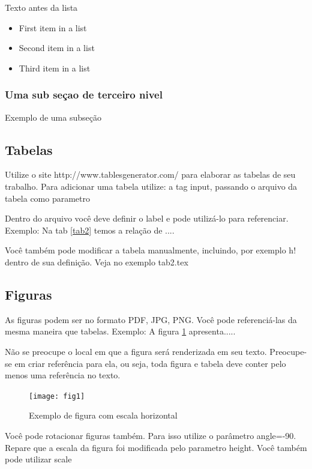 \documentclass[	DIV=calc,%
							paper=a4,%
							fontsize=12pt,%
							onecolumn]{scrartcl}	 					%
\begin{document}
Texto antes da lista

\begin{itemize}
	\item First item in a list 
	\item Second item in a list 
	\item Third item in a list
\end{itemize}

\subsubsection{Uma sub seçao de terceiro nivel}

Exemplo de uma subseção

\subsection{Tabelas}

Utilize o site http://www.tablesgenerator.com/ para elaborar as tabelas de seu trabalho.
Para adicionar uma tabela utilize: a tag input, passando o arquivo da tabela como parametro



Dentro do arquivo você deve definir o label e pode utilizá-lo para referenciar. Exemplo:
Na tab \ref{tab2} temos a relação de ....


Você também pode modificar a tabela manualmente, incluindo, por exemplo h! dentro de sua definição. Veja no exemplo tab2.tex

\subsection{Figuras}

As figuras podem ser no formato PDF, JPG, PNG. Você pode referenciá-las da mesma maneira que tabelas. Exemplo: A figura \ref{fig1} apresenta.....

Não se preocupe o local em que a figura será renderizada em seu texto. Preocupe-se em criar referência para ela, ou seja, toda figura e tabela deve conter pelo menos uma referência no texto.

\begin{figure}
\centering
\texttt{[image: fig1]}
\caption{Exemplo de figura com escala horizontal}
\label{fig1}
\end{figure}



Você pode rotacionar figuras também. Para isso utilize o parâmetro angle=-90. Repare que a escala da figura foi modificada pelo parametro height. Você também pode utilizar scale
\end{document}
